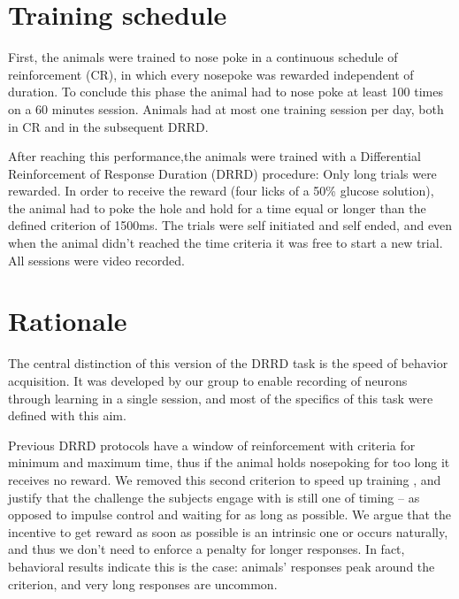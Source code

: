 \section{Training schedule}
    First, the animals were trained to nose poke in a continuous schedule of reinforcement (CR), in which every nosepoke was rewarded independent of duration. To conclude this phase the animal had to nose poke at least 100 times on a 60 minutes session. Animals had at most one training session per day, both in CR and in the subsequent DRRD. 
    
    After reaching this performance,the animals were trained with a Differential Reinforcement of Response Duration (DRRD) procedure: Only long trials were rewarded. In order to receive the reward (four licks of a 50\% glucose solution), the animal had to poke the hole and hold for a time equal or longer than the defined criterion of 1500ms. The trials were self initiated and self ended, and even when the animal didn't reached the time criteria it was free to start a new trial. All sessions were video recorded.

\section{Rationale}
    The central distinction of this version of the DRRD task is the speed of behavior acquisition. It was developed by our group to enable recording of neurons through learning in a single session, and most of the specifics of this task were defined with this aim.
    
    Previous DRRD protocols have a window of reinforcement with criteria for minimum and maximum time, thus if the animal holds nosepoking for too long it receives no reward. We removed this second criterion to speed up training \cite{}, and justify that the challenge the subjects engage with is still one of timing -- as opposed to impulse control and waiting for as long as possible. We argue that the incentive to get reward as soon as possible is an intrinsic one or occurs naturally, and thus we don't need to enforce a penalty for longer responses. In fact, behavioral results indicate this is the case: animals' responses peak around the criterion, and very long responses are uncommon.